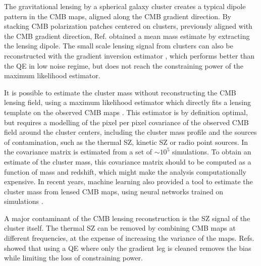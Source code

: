 \documentclass[prd, superscriptaddress, tightenlines, longbibliography, nofootinbib, eqsecnum, amsfonts, amsmath, floatfix, twocolumn, notitlepage]{revtex4-2}
\begin{document}
The gravitational lensing by a spherical galaxy cluster creates a typical dipole pattern in the CMB maps, aligned along the CMB gradient direction. By stacking CMB polarization patches centered on clusters, previously aligned with the CMB gradient direction, Ref. \cite{SPT:2019qkp} obtained a mean mass estimate by extracting the lensing dipole.  
The small scale lensing signal from clusters can also be reconstructed with the gradient inversion estimator \cite{Horowitz:2017iql, Hadzhiyska:2019cle}, which performs better than the QE in low noise regime, but does not reach the constraining power of the maximum likelihood estimator.  

It is possible to estimate the cluster mass without reconstructing the CMB lensing field, using a maximum likelihood estimator which directly fits a lensing template on the observed CMB maps \cite{Lewis:2005fq,Baxter:2014frs, Raghunathan:2017cle}. This estimator is by definition optimal, but requires a modelling of the pixel per pixel covariance of the observed CMB field around the cluster centers, including the cluster mass profile and the sources of contamination, such as the thermal SZ, kinetic SZ or radio point sources. In \cite{Raghunathan:2017cle} the covariance matrix is estimated from a set of $\sim 10^5$ simulations. To obtain an estimate of the cluster mass, this covariance matrix should to be computed as a function of mass and redshift, which might make the analysis computationally expensive.
In recent years, machine learning also provided a tool to estimate the cluster mass from lensed CMB maps, using neural networks trained on simulations \cite{Gupta:2020him}.

A major contaminant of the CMB lensing reconstruction is the SZ signal of the cluster itself. The thermal SZ can be removed by combining CMB maps at different frequencies, at the expense of increasing the variance of the maps. Refs. \cite{Madhavacheril:2018bxi, DES:2018myw, Patil_2020} showed that using a QE where only the gradient leg is cleaned removes the bias while limiting the loss of constraining power. 

\end{document}
